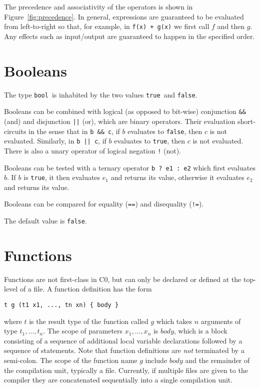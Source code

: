\documentclass[11pt]{article}
\newcommand{\tbool}{\texttt{bool}}
\newcommand{\vtrue}{\texttt{true}}
\newcommand{\vfalse}{\texttt{false}}
\begin{document}
The precedence and associativity of the operators is shown
in Figure~\ref{fig:precedence}.  In general, expressions are
guaranteed to be evaluated from left-to-right so that, for example,
in \verb'f(x) + g(x)' we first call $f$ and then $g$.  Any effects
such as input/output are guaranteed to happen in the specified
order.

\section{Booleans}

The type \tbool\ is inhabited by the two values \vtrue\ and \vfalse.

Booleans can be combined with logical (as opposed to bit-wise)
conjunction \verb'&&' (and) and disjunction \verb'||' (or), which are
binary operators.  Their evaluation short-circuits in the sense that
in \verb'b && c', if $b$ evaluates to \vfalse, then $c$ is not
evaluated.  Similarly, in \verb'b || c', if $b$ evaluates to \vtrue,
then $c$ is not evaluated.  There is also a unary operator of logical
negation \verb'!' (not).

Booleans can be tested with a ternary operator \verb'b ? e1 : e2'
which first evaluates $b$.  If $b$ is \vtrue, it then evaluates
$e_1$ and returns its value, otherwise it evaluates $e_2$
and returns its value.

Booleans can be compared for equality (\verb'==') and disequality
(\verb'!=').

The default value is \vfalse.

\section{Functions}

Functions are not first-class in C0, but can only be declared
or defined at the top-level of a file.  A function definition
has the form
\begin{verbatim}
t g (t1 x1, ..., tn xn) { body }
\end{verbatim}
where $t$ is the result type of the function called $g$ which takes
$n$ arguments of type $t_1, \ldots, t_n$.  The scope of parameters
$x_1, \ldots, x_n$ is $\mathit{body}$, which is a block consisting of
a sequence of additional local variable declarations followed by a
sequence of statements.  Note that function definitions are \emph{not}
terminated by a semi-colon.  The scope of the function name $g$
include $\mathit{body}$ and the remainder of the compilation unit,
typically a file.  Currently, if multiple files are given to
the compiler they are concatenated sequentially into a single
compilation unit.
\end{document}
